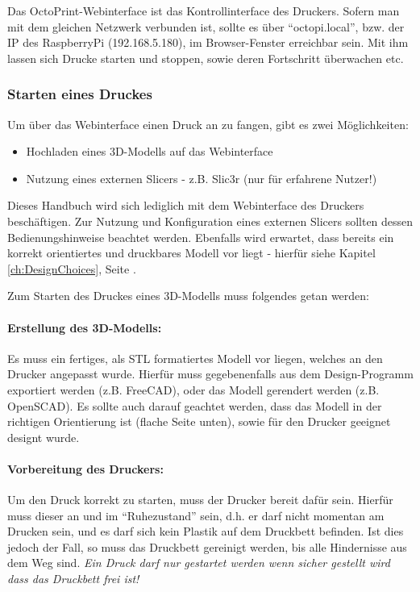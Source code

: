 Das OctoPrint-Webinterface ist das Kontrollinterface des Druckers. Sofern man mit dem gleichen Netzwerk verbunden ist, sollte es über "`octopi.local"', bzw. der IP des RaspberryPi (192.168.5.180), im Browser-Fenster erreichbar sein. Mit ihm lassen sich Drucke starten und stoppen, sowie deren Fortschritt überwachen etc.

\subsubsection{Starten eines Druckes}
Um über das Webinterface einen Druck an zu fangen, gibt es zwei Möglichkeiten:
\begin{itemize}[noitemsep]
\item Hochladen eines 3D-Modells auf das Webinterface
\item Nutzung eines externen Slicers - z.B. Slic3r (nur für erfahrene Nutzer!)
\end{itemize}
Dieses Handbuch wird sich lediglich mit dem Webinterface des Druckers beschäftigen. Zur Nutzung und Konfiguration eines externen Slicers sollten dessen Bedienungshinweise beachtet werden. Ebenfalls wird erwartet, dass bereits ein korrekt orientiertes und druckbares Modell vor liegt - hierfür siehe Kapitel \ref{ch:DesignChoices}, Seite \pageref{ch:DesignChoices}.

Zum Starten des Druckes eines 3D-Modells muss folgendes getan werden:

\paragraph{Erstellung des 3D-Modells:} Es muss ein fertiges, als STL formatiertes Modell vor liegen, welches an den Drucker angepasst wurde. Hierfür muss gegebenenfalls aus dem Design-Programm exportiert werden (z.B. FreeCAD), oder das Modell gerendert werden (z.B. OpenSCAD). Es sollte auch darauf geachtet werden, dass das Modell in der richtigen Orientierung ist (flache Seite unten), sowie für den Drucker geeignet designt wurde.

\paragraph{Vorbereitung des Druckers:} Um den Druck korrekt zu starten, muss der Drucker bereit dafür sein. Hierfür muss dieser an und im "`Ruhezustand"' sein, d.h. er darf nicht momentan am Drucken sein, und es darf sich kein Plastik auf dem Druckbett befinden. Ist dies jedoch der Fall, so muss das Druckbett gereinigt werden, bis alle Hindernisse aus dem Weg sind. \emph{Ein Druck darf nur gestartet werden wenn sicher gestellt wird dass das Druckbett frei ist!}

